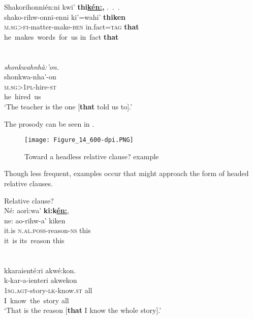 \documentclass[output=paper]{langscibook}
\begin{document}
\gllll Shakorihonnién:ni          kwi’ \textbf{thi\uline{kén:},}  {.~.~.}\\
shako-rihw-onni-enni        ki’=wahi’    \textbf{thiken}\\
\textsc{m.sg>fi-}matter-make-\textsc{ben}  in.fact=\textsc{tag}  \textbf{that}\\
{he~makes~words~for~us}      {in~fact}        \textbf{that}\\~\\~\\

\gllll \textit{shonkwahnhà:’on.}\\
shonkwa-nha’-on\\
\textsc{m.sg>1pl-}hire-\textsc{st}\\
{he~hired~us}\\
\glt ‘The teacher is the one [\textbf{that} told us to].’           \\                                        
\z

The prosody can be seen in .

  
\begin{figure}
\texttt{[image: Figure\_14\_600-dpi.PNG]}
 \caption{\label{fig:mithun:14} Toward a headless relative clause? example }
\end{figure}

Though less frequent, examples occur that might approach the form of headed relative clauses. 

\ea%
    \label{ex:mithun:26}
    Relative clause?\\
      \gllll Né:    aorì:wa’ \textbf{ki:k\uline{én:}},\\
      ne:    ao-rihw-a’            kiken\\
      it.is    \textsc{n.al.poss-}reason-\textsc{ns}  this\\
      {it~is}    {its~reason}            this\\~\\~\\

\gllll      kkaraienté:ri     akwé:kon.\\
      k-kar-a-ienteri              akwekon\\
      \textsc{1sg.agt}{}-story-\textsc{lk-}know.\textsc{st}  all\\
      {I~know~the~story}            all\\

\glt      ‘That is the reason [\textbf{that} I know the whole story].’    
\end{document}
